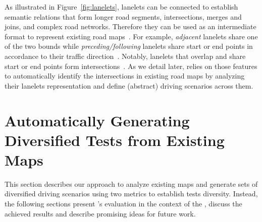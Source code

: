 \documentclass[conference]{IEEEtran}
\begin{document}
As illustrated in Figure~\ref{fig:lanelets}, lanelets can be connected to establish semantic relations that form longer road segments, intersections, merges and joins, and complex road networks. Therefore
they can be used as an intermediate format to represent existing road maps~\cite{althoff2018automatic}. For example, \emph{adjacent} lanelets share one of the two bounds while \emph{preceding/following} lanelets share start or end points in accordance to their traffic direction~\cite{althoff2018automatic}. Notably, lanelets that overlap and share start or end points form intersections~\cite{Althoff2017a}.
%
As we detail later, \tool relies on those features to automatically identify the intersections in existing road maps by analyzing their lanelets representation and define (abstract) driving scenarios across them.


\section{Automatically Generating Diversified Tests from Existing Maps}
This section describes our approach to analyze existing maps and generate sets of diversified driving scenarios using two metrics to establish tests diversity. Instead, the following sections present \tool's evaluation in the context of the \challenge, discuss the achieved results and describe promising ideas for future work.
\end{document}
